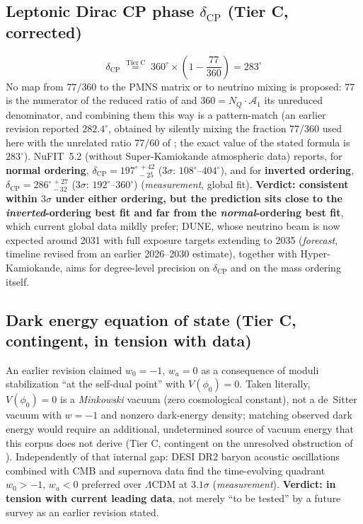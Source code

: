 \documentclass[11pt,a4paper]{article}
\theoremstyle{remark}
\begin{document}
\subsection{Leptonic Dirac CP phase \texorpdfstring{$\delta_{\mathrm{CP}}$}{delta-CP} (Tier C, corrected)}
\begin{equation}
    \delta_{\mathrm{CP}} \;\overset{\mathrm{Tier\ C}}{=}\; 360^\circ\times\left(1-\frac{77}{360}\right) = 283^\circ
\end{equation}
No map from $77/360$ to the PMNS matrix or to neutrino mixing is proposed: $77$ is the numerator of
the reduced ratio of  and $360=N_Q\cdot\mathcal A_1$ its unreduced denominator, and
combining them this way is a pattern-match
(an earlier revision reported $282.4^\circ$, obtained by silently mixing the fraction $77/360$ used
here with the unrelated ratio $77/60$ of ; the exact value of the stated formula is
$283^\circ$). NuFIT~5.2 (without Super-Kamiokande atmospheric data) reports, for \textbf{normal
ordering}, $\delta_{\mathrm{CP}}=197^{\circ\,+42}_{\ \ -25}$ ($3\sigma$: $108^\circ$--$404^\circ$),
and for \textbf{inverted ordering}, $\delta_{\mathrm{CP}}=286^{\circ\,+27}_{\ \ -32}$ ($3\sigma$:
$192^\circ$--$360^\circ$) \cite{NuFIT52} (\emph{measurement}, global fit). \textbf{Verdict:
consistent within $3\sigma$ under either ordering, but the prediction sits close to the
\emph{inverted}-ordering best fit and far from the \emph{normal}-ordering best fit}, which current
global data mildly prefer; DUNE, whose neutrino beam is now expected around 2031 with full exposure
targets extending to 2035 \cite{DUNE2025Status} (\emph{forecast}, timeline revised from an earlier
2026--2030 estimate), together with Hyper-Kamiokande, aims for degree-level precision on
$\delta_{\mathrm{CP}}$ and on the mass ordering itself.

\subsection{Dark energy equation of state (Tier C, contingent, in tension with data)}
An earlier revision claimed $w_0=-1,\,w_a=0$ as a consequence of moduli stabilization ``at the
self-dual point'' with $V(\phi_0)=0$. Taken literally, $V(\phi_0)=0$ is a \emph{Minkowski} vacuum
(zero cosmological constant), not a de~Sitter vacuum with $w=-1$ and nonzero dark-energy density;
matching observed dark energy would require an additional, undetermined source of vacuum energy that
this corpus does not derive (Tier C, contingent on the unresolved obstruction of
). Independently of that internal gap: DESI DR2 baryon acoustic
oscillations combined with CMB and supernova data find the time-evolving quadrant $w_0>-1$, $w_a<0$
preferred over $\Lambda$CDM at $3.1\sigma$ \cite{DESI2025DR2,DESI2025DR2ext} (\emph{measurement}).
\textbf{Verdict: in tension with current leading data}, not merely ``to be tested'' by a future
survey as an earlier revision stated.
\end{document}
